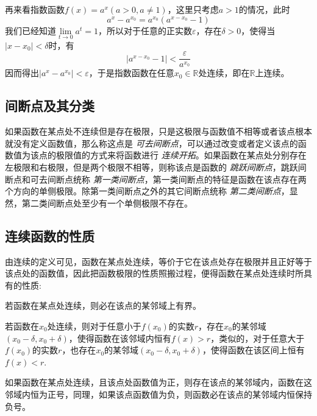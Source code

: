\begin{example}
  \label{example:continous-of-a-power-integer-with-a-greater-1}
  再来看指数函数$f(x)=a^x(a>0,a\neq 1)$，这里只考虑$a>1$的情况，此时
  \[ a^x-a^{x_0} = a^{x_0}(a^{x-x_0}-1) \]
  我们已经知道$\lim\limits_{t \to 0} a^t = 1$，所以对于任意的正实数$\varepsilon$，存在$\delta>0$，使得当$|x-x_0|<\delta$时，有
  \[ |a^{x-x_0}-1| < \frac{\varepsilon}{a^{x_0}} \]
  因而得出$|a^x-a^{x_0}|<\varepsilon$，于是指数函数在任意$x_0 \in \mathbb{R}$处连续，即在$\mathbb{R}$上连续。
\end{example}

\subsection{间断点及其分类}
\label{sec:discontinuity-point-and-its-category}

如果函数在某点处不连续但是存在极限，只是这极限与函数值不相等或者该点根本就没有定义函数值，那么称这点是 \emph{可去间断点}，可以通过改变或者定义该点的函数值为该点的极限值的方式来将函数进行 \emph{连续开拓}。如果函数在某点处分别存在左极限和右极限，但是两个极限不相等，则称该点是函数的 \emph{跳跃间断点}，跳跃间断点和可去间断点统称 \emph{第一类间断点}，第一类间断点的特征是函数在该点存在两个方向的单侧极限。除第一类间断点之外的其它间断点统称 \emph{第二类间断点}，显然，第二类间断点处至少有一个单侧极限不存在。

\subsection{连续函数的性质}
\label{sec:properties-of-continuous-function}


由连续的定义可见，函数在某点处连续，等价于它在该点处存在极限并且正好等于该点处的函数值，因此把函数极限的性质照搬过程，便得函数在某点处连续时所具有的性质:
\begin{theorem}[局部有界性]
  若函数在某点处连续，则必在该点的某邻域上有界。
\end{theorem}

\begin{theorem}[局部保号性]
  若函数在$x_0$处连续，则对于任意小于$f(x_0)$的实数$r$，存在$x_0$的某邻域$(x_0-\delta,x_0+\delta)$，使得函数在该邻域内恒有$f(x)>r$，类似的，对于任意大于$f(x_0)$的实数$r$，也存在$x_0$的某邻域$(x_0-\delta,x_0+\delta)$，使得函数在该区间上恒有$f(x)<r$.
\end{theorem}

\begin{inference}
  如果函数在某点处连续，且该点处函数值为正，则存在该点的某邻域内，函数在这邻域内恒为正号，同理，如果该点函数值为负，则函数必在该点的某邻域内恒保持负号。
\end{inference}

